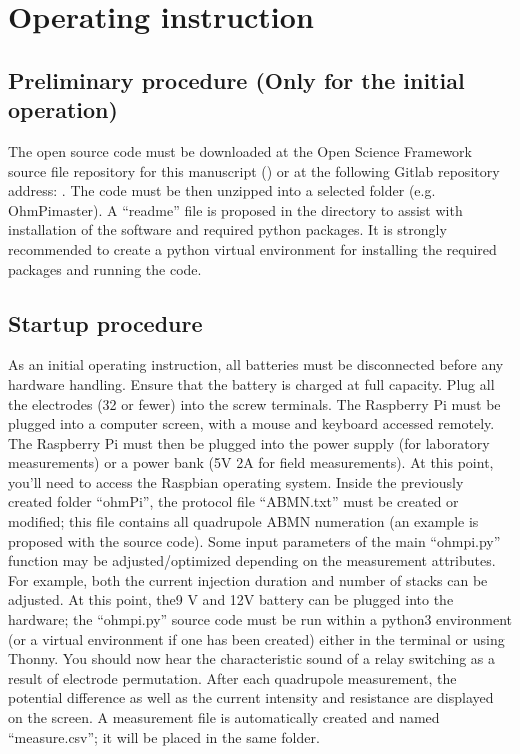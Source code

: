 \documentclass[letterpaper,10pt,english]{sphinxmanual}
\begin{document}
\section{Operating instruction}
\label{\detokenize{V1_01:operating-instruction}}

\subsection{Preliminary procedure (Only for the initial operation)}
\label{\detokenize{V1_01:preliminary-procedure-only-for-the-initial-operation}}
\sphinxAtStartPar
The open source code must be downloaded at the Open Science Framework source file repository for this manuscript ()
or at the following Gitlab repository address: . The code must be then unzipped into a selected folder (e.g. OhmPi\sphinxhyphen{}master). A “readme” file
is proposed in the directory to assist with installation of the software and required python packages. It is strongly recommended to create a python virtual environment for installing
the required packages and running the code.


\subsection{Startup procedure}
\label{\detokenize{V1_01:startup-procedure}}
\sphinxAtStartPar
As an initial operating instruction, all batteries must be disconnected before any hardware handling. Ensure that the battery is charged at full capacity. Plug all the electrodes (32 or fewer)
into the screw terminals. The Raspberry Pi must be plugged into a computer screen, with a mouse and keyboard accessed remotely. The Raspberry Pi must then be plugged into the power supply
(for laboratory measurements) or a power bank (5V \sphinxhyphen{} 2A for field measurements). At this point, you’ll need to access the Raspbian operating system. Inside the previously created folder “ohmPi”,
the protocol file “ABMN.txt” must be created or modified; this file contains all quadrupole ABMN numeration (an example is proposed with the source code). Some input parameters of the main “ohmpi.py”
function may be adjusted/optimized depending on the measurement attributes. For example, both the current injection duration and number of stacks can be adjusted. At this point, the9 V and 12\sphinxhyphen{}V battery can be
plugged into the hardware; the “ohmpi.py” source code must be run within a python3 environment (or a virtual environment if one has been created) either in the terminal or using Thonny. You should now
hear the characteristic sound of a relay switching as a result of electrode permutation. After each quadrupole measurement, the potential difference as well as the current intensity and resistance
are displayed on the screen. A measurement file is automatically created and named “measure.csv”; it will be placed in the same folder.
\end{document}
